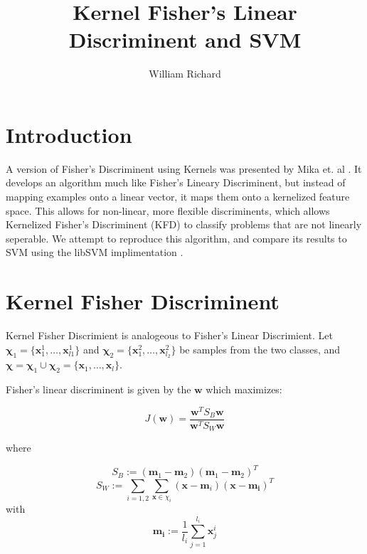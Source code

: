 \documentclass[12pt]{article}
\begin{document}
\title{Kernel Fisher's Linear Discriminent and SVM}
\author{William Richard}
\maketitle

\section{Introduction}
A version of Fisher's Discriminent using Kernels was presented by Mika et. al \cite{kfd}.  It develops an algorithm much like Fisher's Lineary Discriminent, but instead of mapping examples onto a linear vector, it maps them onto a kernelized feature space.  This allows for non-linear, more flexible discriminents, which allows  Kernelized Fisher's Discriminent (KFD) to classify problems that are not linearly seperable.  We attempt to reproduce this algorithm, and compare its results to SVM using the libSVM implimentation \cite{libsvm}.

\section{Kernel Fisher Discriminent}
Kernel Fisher Discrimient is analogeous to Fisher's Linear Discrimient.  Let $\boldsymbol{\chi}_1 = \{\boldsymbol{x}_1 ^1, \dotsc , \boldsymbol{x}_{l1} ^1\}$ and $\boldsymbol{\chi}_2 = \{\boldsymbol{x}_1^2 , \dotsc , \boldsymbol{x}_{l_2} ^ 2\} $ be samples from the two classes, and $\boldsymbol{\chi} = \boldsymbol{\chi}_1 \cup \boldsymbol{\chi}_2 = \{\boldsymbol{x}_1, \dotsc , \boldsymbol{x}_l\}$.

Fisher's linear discriminent is given by the $\boldsymbol{w}$ which maximizes:

\begin{equation}
J(\boldsymbol{w}) = \frac{\boldsymbol{w}^T S_B \boldsymbol{w}}{\boldsymbol{w}^T S_W \boldsymbol{w}}
\label{FLD_J}
\end{equation}

where

\begin{equation}
S_B := (\boldsymbol{m}_1 -\boldsymbol{ m}_2)(\boldsymbol{m}_1 - \boldsymbol{m}_2)^T 
\label{FLD_SB}
\end{equation}
\begin{equation}
S_W := \sum_{i=1,2} \sum_{\boldsymbol{x} \in \chi_i} (\boldsymbol{x}-\boldsymbol{m}_i)(\boldsymbol{x}-\boldsymbol{m_i})^T
\label{FLD_SW}
\end{equation}
with
\begin{equation}
\boldsymbol{m_i} := \frac{1}{l_i} \sum_{j=1}^{l_i} \boldsymbol{x}_j^i
\label{FLD_m}
\end{equation}
\end{document}
